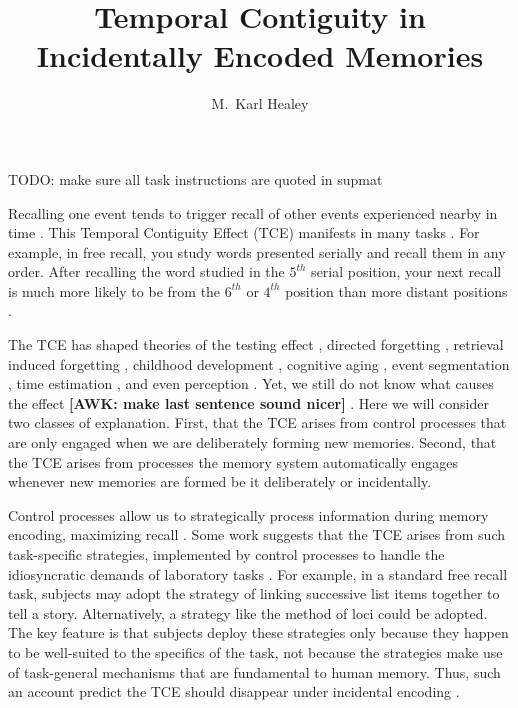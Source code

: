 \documentclass[man,natbib,floatsintext]{apa6} %
\title{Temporal Contiguity in Incidentally Encoded Memories}
\author{M.\ Karl Healey}
\affiliation{Michigan State University}
\begin{document}
\maketitle


TODO: make sure all task instructions are quoted in supmat



Recalling one event tends to trigger recall of other events experienced nearby in time \citep{Aris,Bowe72,Kaha96}. This Temporal Contiguity Effect (TCE) manifests in many tasks \citep{DaviEtal08,SchwEtal05}. For example, in free recall, you study words presented serially and recall them in any order. After recalling the word studied in the $5^{th}$ serial position, your next recall is much more likely to be from the $6^{th}$ or $4^{th}$ position than more distant positions \citep{Kaha96}. 

The TCE has shaped theories of the testing effect \citep{KarpEtal14}, directed forgetting \citep{SahaEtal13}, retrieval induced forgetting \citep{KlieBaum16}, childhood development \citep{JarroEtal15}, cognitive aging \citep{WahlHuff15,HealKaha15}, event segmentation \citep{EzzyDava14}, time estimation \citep{SahaSmit13}, and even perception \citep{TurkEtal12}. Yet, we still do not know what causes the effect \textbf{[AWK: make last sentence sound nicer]} \citep{HealKaha17}. Here we will consider two classes of explanation. First, that the TCE arises from control processes that are only engaged when we are deliberately forming new memories. Second, that the TCE arises from processes the memory system automatically engages whenever new memories are formed be it deliberately or incidentally.   


Control processes \citep{LehmMalm13,RaaiShif81} allow us to strategically process information during memory encoding, maximizing recall \citep[e.g.,][]{Unsw16}. Some work suggests that the TCE arises from such task-specific strategies, implemented by control processes to handle the idiosyncratic demands of laboratory tasks \citep{Hint16}. For example, in a standard free recall task, subjects may adopt the strategy of linking successive list items together to tell a story. Alternatively, a strategy like the method of loci could be adopted. The key feature is that subjects deploy these strategies only because they happen to be well-suited to the specifics of the task, not because the strategies make use of task-general mechanisms that are fundamental to human memory. Thus, such an account predict the TCE should disappear under incidental encoding \citep{Hint16}.
\end{document}
